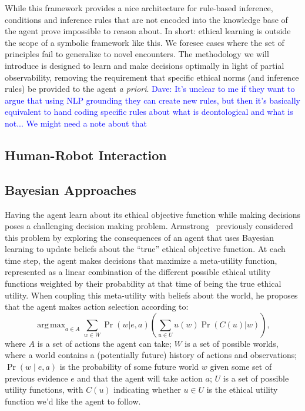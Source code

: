 \documentclass[11pt]{article}
\newcommand\davenote[1]{\textcolor{blue}{Dave: #1}}
\DeclareMathOperator*{\argmax}{arg\,max}
\begin{document}
While this framework provides a nice architecture for rule-based inference, conditions and inference rules that are not encoded into the knowledge base of the agent prove impossible to reason about. In short: ethical learning is outside the scope of a symbolic framework like this. We foresee cases where the set of principles fail to generalize to novel encounters. The methodology we will introduce is designed to learn and make decisions optimally in light of partial observability, removing the requirement that specific ethical norms (and inference rules) be provided to the agent {\it a priori}. \davenote{It's unclear to me if they want to argue that using NLP grounding they can create new rules, but then it's basically equivalent to hand coding specific rules about what is deontological and what is not... We might need a note about that}


\subsection{Human-Robot Interaction}


\subsection{Bayesian Approaches}

Having the agent learn about its ethical objective function while making decisions poses a challenging decision making problem. Armstrong~ previously considered this problem by exploring the consequences of an agent that uses Bayesian learning to update beliefs about the ``true'' ethical objective function. At each time step, the agent makes decisions that maximize a meta-utility function, represented as a linear combination of the different possible ethical utility functions weighted by their probability at that time of being the true ethical utility. When coupling this meta-utility with beliefs about the world, he proposes that the agent makes action selection according to:
\begin{equation}
\label{eq:armstrong}
\argmax_{a \in A} \sum_{w \in W} \Pr(w | e, a) \left( \sum_{u \in U} u(w) \Pr(C(u)|w) \right),
\end{equation}
where $A$ is a set of actions the agent can take; $W$ is a set of possible worlds, where a world contains a (potentially future) history of actions and observations; $\Pr(w \mid e, a)$ is the probability of some future world $w$ given some set of previous evidence $e$ and that the agent will take action $a$; $U$ is a set of possible utility functions, with $C(u)$ indicating whether $u \in U$ is the ethical utility function we'd like the agent to follow.
\end{document}
